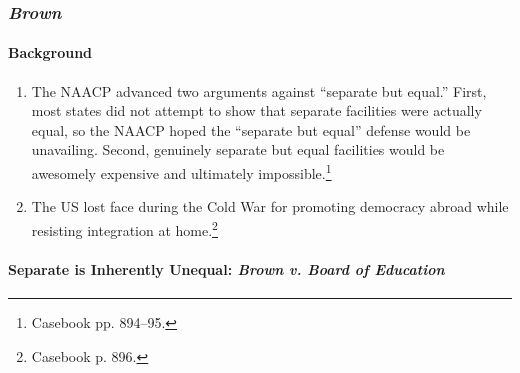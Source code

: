 \subsubsection{\emph{Brown}}

\paragraph{Background}

\begin{enumerate}
    \item The NAACP advanced two arguments against ``separate but equal.'' 
    First, most states did not attempt to show that separate facilities were 
    actually equal, so the NAACP hoped the ``separate but equal'' defense 
    would be unavailing. Second, genuinely separate but equal facilities would 
    be awesomely expensive and ultimately impossible.\footnote{Casebook pp. 
    894--95.}
    \item The US lost face during the Cold War for promoting democracy abroad 
    while resisting integration at home.\footnote{Casebook p. 896.}
\end{enumerate}

\paragraph{Separate is Inherently Unequal: \emph{Brown v. Board of Education}}


